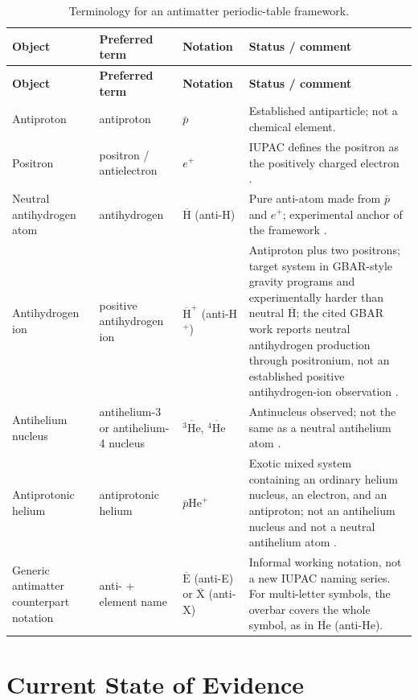 \documentclass[11pt,a4paper]{article}
\newcommand{\anti}[1]{\ensuremath{\overline{\mathrm{#1}}}}
\newcommand{\antiH}{\ensuremath{\overline{\mathrm{H}}}}
\newcommand{\antiHe}{\ensuremath{\overline{\mathrm{He}}}}
\newcommand{\antiE}{\ensuremath{\overline{\mathrm{E}}}}
\newcommand{\ap}{\ensuremath{\bar p}}
\newcommand{\ep}{\ensuremath{e^+}}
\begin{document}
\begin{longtable}{L{0.19\textwidth}L{0.20\textwidth}L{0.16\textwidth}L{0.33\textwidth}}
\caption{Terminology for an antimatter periodic-table framework.}\label{tab:nomenclature}\\
\toprule
\textbf{Object} & \textbf{Preferred term} & \textbf{Notation} & \textbf{Status / comment}\\
\midrule
\endfirsthead
\toprule
\textbf{Object} & \textbf{Preferred term} & \textbf{Notation} & \textbf{Status / comment}\\
\midrule
\endhead
Antiproton & antiproton & \ap & Established antiparticle; not a chemical element.\\
Positron & positron / antielectron & \ep & IUPAC defines the positron as the positively charged electron \cite{IUPACpositron}.\\
Neutral antihydrogen atom & antihydrogen & \antiH{} (anti-H) & Pure anti-atom made from \ap{} and \ep{}; experimental anchor of the framework \cite{ATHENA2002,ATRAP2002,Andresen2010,Andresen2011,ALPHA2018}.\\
Antihydrogen ion & positive antihydrogen ion & $\antiH^{+}$ (anti-H$^{+}$) & Antiproton plus two positrons; target system in GBAR-style gravity programs and experimentally harder than neutral \antiH{}; the cited GBAR work reports neutral antihydrogen production through positronium, not an established positive antihydrogen-ion observation \cite{GBAR2023}.\\
Antihelium nucleus & antihelium-3 or antihelium-4 nucleus & $\overline{{}^{3}\mathrm{He}}$, $\overline{{}^{4}\mathrm{He}}$ & Antinucleus observed; not the same as a neutral antihelium atom \cite{STAR2011}.\\
Antiprotonic helium & antiprotonic helium & $\bar p\mathrm{He}^{+}$ & Exotic mixed system containing an ordinary helium nucleus, an electron, and an antiproton; not an antihelium nucleus and not a neutral antihelium atom \cite{Hori2011}.\\
Generic antimatter counterpart notation & anti- + element name & \antiE{} (anti-E) or \anti{X} (anti-X) & Informal working notation, not a new IUPAC naming series. For multi-letter symbols, the overbar covers the whole symbol, as in \antiHe{} (anti-He).\\
\bottomrule
\end{longtable}

\section{Current State of Evidence}
\end{document}
